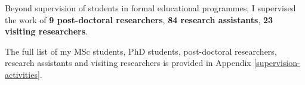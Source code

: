 Beyond supervision of students in formal educational programmes, I
supervised the work of \textbf{9 post-doctoral researchers}, \textbf{84
research assistants}, \textbf{23 visiting researchers}.

The full list of my MSc students, PhD students, post-doctoral
researchers, research assistants and visiting researchers is provided in
Appendix \ref{supervision-activities}.
